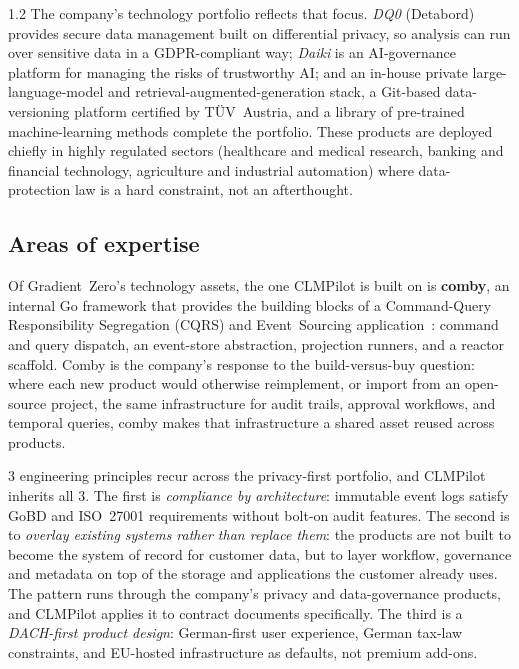 \begin{spacing}{1.2}
The company's technology portfolio reflects that focus. \textit{DQ0}
(Detabord) provides secure data management built on differential privacy, so
analysis can run over sensitive data in a GDPR-compliant way; \textit{Daiki}
is an AI-governance platform for managing the risks of trustworthy AI; and an
in-house private large-language-model and retrieval-augmented-generation
stack, a Git-based data-versioning platform certified by TÜV~Austria, and a
library of pre-trained machine-learning methods complete the portfolio. These
products are deployed chiefly in highly regulated sectors (healthcare and
medical research, banking and financial technology, agriculture and industrial
automation) where data-protection law is a hard constraint, not an
afterthought.

\subsection{Areas of expertise}
\label{sec:areas-expertise}
Of Gradient~Zero's technology assets, the one CLMPilot is built on is
\textbf{comby}, an internal Go framework that provides the building blocks of
a Command-Query Responsibility Segregation (CQRS) and Event~Sourcing
application~\cite{Young2010,FowlerCQRS,FowlerEventSourcing}: command and
query dispatch, an
event-store abstraction, projection runners, and a reactor scaffold. Comby is
the company's response to the build-versus-buy question: where each
new product would otherwise reimplement, or import from an open-source
project, the same infrastructure for audit trails, approval workflows, and
temporal queries, comby makes that infrastructure a shared asset reused across
products.

3 engineering principles recur across the privacy-first portfolio, and
CLMPilot inherits all 3. The first is \textit{compliance by architecture}:
immutable event logs satisfy GoBD and ISO~27001 requirements without
bolt-on audit features. The second is to \textit{overlay existing systems
rather than replace them}: the products are not built to become the system
of record for customer data, but to layer workflow, governance and metadata
on top of the storage and applications the customer already uses. The pattern
runs through the company's privacy and data-governance products, and
CLMPilot applies it to contract documents specifically. The third is a
\textit{DACH-first product design}: German-first user experience,
German tax-law constraints, and EU-hosted infrastructure as defaults,
not premium add-ons.


\end{spacing}

